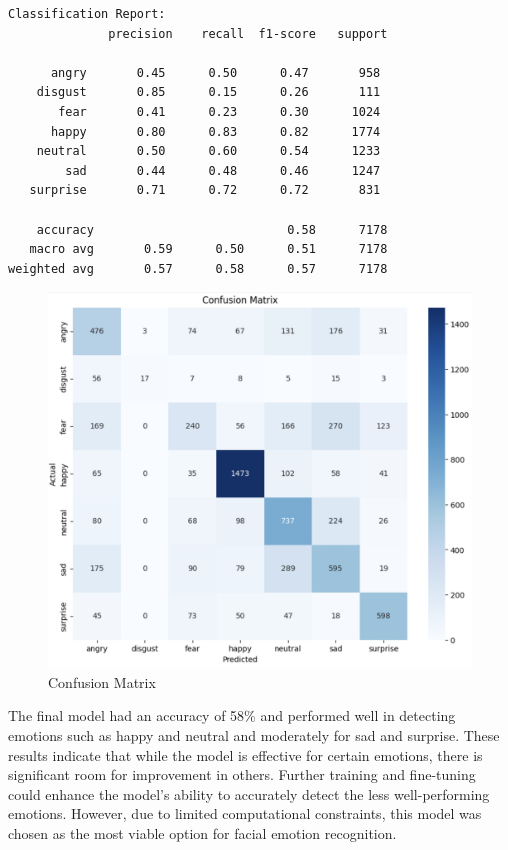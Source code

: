 \documentclass{article}
\begin{document}
\begin{verbatim}
Classification Report:
              precision    recall  f1-score   support

      angry       0.45      0.50      0.47       958
    disgust       0.85      0.15      0.26       111
       fear       0.41      0.23      0.30      1024
      happy       0.80      0.83      0.82      1774
    neutral       0.50      0.60      0.54      1233
        sad       0.44      0.48      0.46      1247
   surprise       0.71      0.72      0.72       831

    accuracy                           0.58      7178
   macro avg       0.59      0.50      0.51      7178
weighted avg       0.57      0.58      0.57      7178
\end{verbatim}

\begin{figure}[htbp]
    \centering
    \includegraphics[width=\linewidth]{confusion_matrix.png}
    \caption{Confusion Matrix}
    \label{fig:confusion_matrix}
\end{figure}

The final model had an accuracy of 58\% and performed well in detecting emotions such as happy and neutral and moderately for sad and surprise.
These results indicate that while the model is effective for certain emotions, there is significant room for improvement in others. 
Further training and fine-tuning could enhance the model's ability to accurately detect the less well-performing emotions. However, due to limited computational constraints, this model was chosen as the most viable option for facial emotion recognition.
\end{document}
